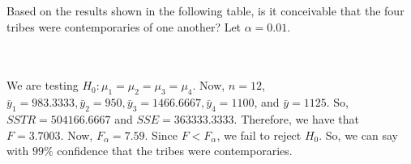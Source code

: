 Based on the results shown in the following table, is it conceivable that the four tribes were
contemporaries of one another? Let $\alpha=0.01$.\\\\

\begin{solution}\renewcommand{\qedsymbol}{}\ \\
    We are testing $H_0:\mu_1=\mu_2=\mu_3=\mu_4$. Now, $n=12$,
    $\bar{y}_1=983.3333, \bar{y}_2=950, \bar{y}_3=1466.6667, \bar{y}_4=1100$, and $\bar{y}=1125$. So,
    $SSTR=504166.6667$ and $SSE=363333.3333$. Therefore, we have that $F=3.7003$. Now,
    $F_{\alpha}=7.59$. Since $F<F_{\alpha}$, we fail to reject $H_0$. So, we can say with $99\%$
    confidence that the tribes were contemporaries.

\end{solution}